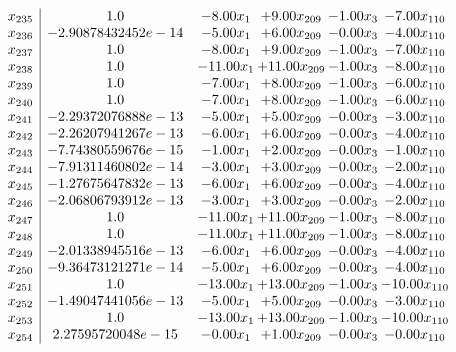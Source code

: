 \documentclass[8pt]{article}
\begin{document}
\[\begin{array}{c| c c@{\hskip 2pt} c@{\hskip 2pt} c@{\hskip 2pt} c@{\hskip 2pt} }
 x_{235}   &  1.0 & -8.00 x_{1} & +  9.00 x_{209} & -1.00 x_{3} & -7.00 x_{110}\\
 x_{236}   &  -2.90878432452e-14 & -5.00 x_{1} & +  6.00 x_{209} & -0.00 x_{3} & -4.00 x_{110}\\
 x_{237}   &  1.0 & -8.00 x_{1} & +  9.00 x_{209} & -1.00 x_{3} & -7.00 x_{110}\\
 x_{238}   &  1.0 & -11.00 x_{1} & + 11.00 x_{209} & -1.00 x_{3} & -8.00 x_{110}\\
 x_{239}   &  1.0 & -7.00 x_{1} & +  8.00 x_{209} & -1.00 x_{3} & -6.00 x_{110}\\
 x_{240}   &  1.0 & -7.00 x_{1} & +  8.00 x_{209} & -1.00 x_{3} & -6.00 x_{110}\\
 x_{241}   &  -2.29372076888e-13 & -5.00 x_{1} & +  5.00 x_{209} & -0.00 x_{3} & -3.00 x_{110}\\
 x_{242}   &  -2.26207941267e-13 & -6.00 x_{1} & +  6.00 x_{209} & -0.00 x_{3} & -4.00 x_{110}\\
 x_{243}   &  -7.74380559676e-15 & -1.00 x_{1} & +  2.00 x_{209} & -0.00 x_{3} & -1.00 x_{110}\\
 x_{244}   &  -7.91311460802e-14 & -3.00 x_{1} & +  3.00 x_{209} & -0.00 x_{3} & -2.00 x_{110}\\
 x_{245}   &  -1.27675647832e-13 & -6.00 x_{1} & +  6.00 x_{209} & -0.00 x_{3} & -4.00 x_{110}\\
 x_{246}   &  -2.06806793912e-13 & -3.00 x_{1} & +  3.00 x_{209} & -0.00 x_{3} & -2.00 x_{110}\\
 x_{247}   &  1.0 & -11.00 x_{1} & + 11.00 x_{209} & -1.00 x_{3} & -8.00 x_{110}\\
 x_{248}   &  1.0 & -11.00 x_{1} & + 11.00 x_{209} & -1.00 x_{3} & -8.00 x_{110}\\
 x_{249}   &  -2.01338945516e-13 & -6.00 x_{1} & +  6.00 x_{209} & -0.00 x_{3} & -4.00 x_{110}\\
 x_{250}   &  -9.36473121271e-14 & -5.00 x_{1} & +  6.00 x_{209} & -0.00 x_{3} & -4.00 x_{110}\\
 x_{251}   &  1.0 & -13.00 x_{1} & + 13.00 x_{209} & -1.00 x_{3} & -10.00 x_{110}\\
 x_{252}   &  -1.49047441056e-13 & -5.00 x_{1} & +  5.00 x_{209} & -0.00 x_{3} & -3.00 x_{110}\\
 x_{253}   &  1.0 & -13.00 x_{1} & + 13.00 x_{209} & -1.00 x_{3} & -10.00 x_{110}\\
 x_{254}   &  2.27595720048e-15 & -0.00 x_{1} & +  1.00 x_{209} & -0.00 x_{3} & -0.00 x_{110}\\

\end{array}\]
\end{document}
